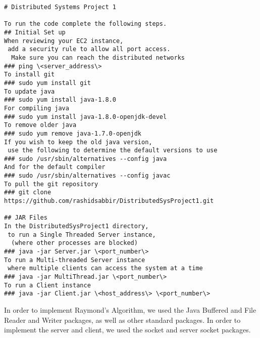 \documentclass{article}
\begin{document}
\begin{lstlisting}
# Distributed Systems Project 1

To run the code complete the following steps.
## Initial Set up
When reviewing your EC2 instance, 
 add a security rule to allow all port access.
  Make sure you can reach the distributed networks
### ping \<server_address\>  
To install git
### sudo yum install git
To update java
### sudo yum install java-1.8.0
For compiling java
### sudo yum install java-1.8.0-openjdk-devel
To remove older java
### sudo yum remove java-1.7.0-openjdk
If you wish to keep the old java version,
 use the following to determine the default versions to use
### sudo /usr/sbin/alternatives --config java
And for the default compiler
### sudo /usr/sbin/alternatives --config javac
To pull the git repository
### git clone https://github.com/rashidsabbir/DistributedSysProject1.git

## JAR Files
In the DistributedSysProject1 directory,
 to run a Single Threaded Server instance,
  (where other processes are blocked) 
### java -jar Server.jar \<port_number\>
To run a Multi-threaded Server instance
 where multiple clients can access the system at a time
### java -jar MultiThread.jar \<port_number\>
To run a Client instance
### java -jar Client.jar \<host_address\> \<port_number\>  

\end{lstlisting}
\label{sec:Methodology}
In order to implement Raymond's Algorithm, we used the Java Buffered and File Reader and Writer packages, as well as other standard packages. In order to implement the server and client, we used the socket and server socket packages.
\end{document}
